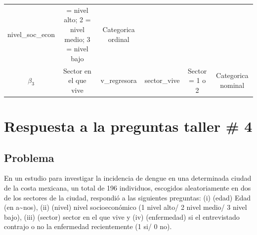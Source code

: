 \documentclass[
]{article}
\begin{document}
\begin{longtable}[]{@{}cccccc@{}}
\begin{minipage}[t]{0.18\columnwidth}
nivel\_soc\_econ\strut
\end{minipage} & \begin{minipage}[t]{0.15\columnwidth}\centering
1 = nivel alto; 2 = nivel medio; 3 = nivel bajo\strut
\end{minipage} & \begin{minipage}[t]{0.13\columnwidth}\centering
Categorica ordinal\strut
\end{minipage}\tabularnewline
\begin{minipage}[t]{0.07\columnwidth}\centering
\(\beta_3\)\strut
\end{minipage} & \begin{minipage}[t]{0.13\columnwidth}\centering
Sector en el que vive\strut
\end{minipage} & \begin{minipage}[t]{0.17\columnwidth}\centering
v\_regresora\strut
\end{minipage} & \begin{minipage}[t]{0.18\columnwidth}\centering
sector\_vive\strut
\end{minipage} & \begin{minipage}[t]{0.15\columnwidth}\centering
Sector = 1 o 2\strut
\end{minipage} & \begin{minipage}[t]{0.13\columnwidth}\centering
Categorica nominal\strut
\end{minipage}\tabularnewline
\bottomrule
\end{longtable}

\hypertarget{respuesta-a-la-preguntas-taller-4}{%
\section{Respuesta a la preguntas taller \#
4}\label{respuesta-a-la-preguntas-taller-4}}

\hypertarget{problema}{%
\subsection{Problema}\label{problema}}

En un estudio para investigar la incidencia de dengue en una determinada
ciudad de la costa mexicana, un total de 196 individuos, escogidos
aleatoriamente en dos de los sectores de la ciudad, respondió a las
siguientes preguntas: (i) (edad) Edad (en a\textasciitilde nos), (ii)
(nivel) nivel socioeconómico (1 nivel alto/ 2 nivel medio/ 3 nivel
bajo), (iii) (sector) sector en el que vive y (iv) (enfermedad) si el
entrevistado contrajo o no la enfermedad recientemente (1 si/ 0 no).
\end{document}
